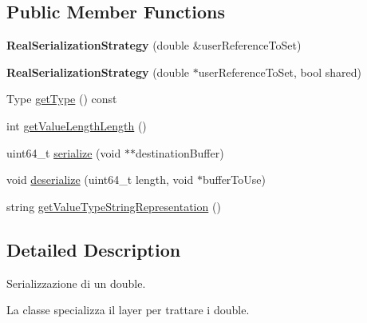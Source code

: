 \subsection*{Public Member Functions}
\begin{DoxyCompactItemize}
\item 
\hypertarget{class_real_serialization_strategy_a4731d1b12e817ebe82cc3b9085516cec}{
{\bfseries RealSerializationStrategy} (double \&userReferenceToSet)}
\label{class_real_serialization_strategy_a4731d1b12e817ebe82cc3b9085516cec}

\item 
\hypertarget{class_real_serialization_strategy_a1542ef27c2f74fe3a788e917d8a11496}{
{\bfseries RealSerializationStrategy} (double $\ast$userReferenceToSet, bool shared)}
\label{class_real_serialization_strategy_a1542ef27c2f74fe3a788e917d8a11496}

\item 
Type \hyperlink{class_real_serialization_strategy_a2a099003e86b8d5601894a6c0200a816}{getType} () const 
\item 
int \hyperlink{class_real_serialization_strategy_af0d00e6a3a4317ad88308b8a8b0873d5}{getValueLengthLength} ()
\item 
uint64\_\-t \hyperlink{class_real_serialization_strategy_a31afb9b78619e20f4b449e6a6930847c}{serialize} (void $\ast$$\ast$destinationBuffer)
\item 
void \hyperlink{class_real_serialization_strategy_a7974c597dbfdab1a4b4c0356b6d98d87}{deserialize} (uint64\_\-t length, void $\ast$bufferToUse)
\item 
string \hyperlink{class_real_serialization_strategy_a8b64f0636016003f23d4e9474222cb5a}{getValueTypeStringRepresentation} ()
\end{DoxyCompactItemize}


\subsection{Detailed Description}
Serializzazione di un double. 

La classe specializza il layer per trattare i double. 

